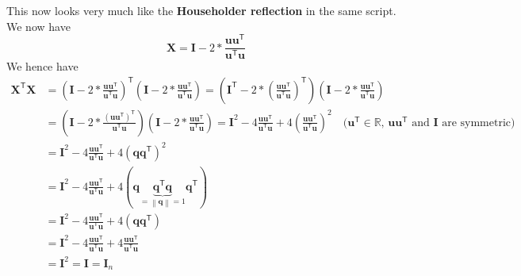 \documentclass{article}
\begin{document}
This now looks very much like the \textbf{Householder reflection} in the same script. We now have
\begin{equation*}
    \mathbf{X} = \mathbf{I} - 2 * \frac{\mathbf{u}\mathbf{u}^{\mathsf{T}}}{\mathbf{u}^{\mathsf{T}}\mathbf{u}}
\end{equation*}
We hence have
\begin{align*}
\mathbf{X}^{\mathsf{T}}\mathbf{X} &= \left(\mathbf{I} - 2 * \frac{\mathbf{u}\mathbf{u}^{\mathsf{T}}}{\mathbf{u}^{\mathsf{T}}\mathbf{u}}\right)^{\mathsf{T}}\left(\mathbf{I} - 2 * \frac{\mathbf{u}\mathbf{u}^{\mathsf{T}}}{\mathbf{u}^{\mathsf{T}}\mathbf{u}}\right) = \left(\mathbf{I}^{\mathsf{T}} - 2 *  \left(\frac{\mathbf{u}\mathbf{u}^{\mathsf{T}}}{\mathbf{u}^{\mathsf{T}}\mathbf{u}}\right)^{\mathsf{T}}\right)\left(\mathbf{I} - 2 * \frac{\mathbf{u}\mathbf{u}^{\mathsf{T}}}{\mathbf{u}^{\mathsf{T}}\mathbf{u}}\right) \\
&= \left(\mathbf{I} - 2 *  \frac{\left(\mathbf{u}\mathbf{u}^{\mathsf{T}}\right)^{\mathsf{T}}}{\mathbf{u}^{\mathsf{T}}\mathbf{u}}\right)\left(\mathbf{I} - 2 * \frac{\mathbf{u}\mathbf{u}^{\mathsf{T}}}{\mathbf{u}^{\mathsf{T}}\mathbf{u}}\right) 
 = \mathbf{I}^{2} - 4\frac{\mathbf{u}\mathbf{u}^{\mathsf{T}}}{\mathbf{u}^{\mathsf{T}}\mathbf{u}} + 4\left(\frac{\mathbf{u}\mathbf{u}^{\mathsf{T}}}{\mathbf{u}^{\mathsf{T}}\mathbf{u}}\right)^{2} \quad \text{($\mathbf{u}^{\mathsf{T}}\in \mathbb{R}$, $\mathbf{u}\mathbf{u}^{\mathsf{T}}$ and $\mathbf{I}$ are symmetric)} \\
&= \mathbf{I}^{2} - 4\frac{\mathbf{u}\mathbf{u}^{\mathsf{T}}}{\mathbf{u}^{\mathsf{T}}\mathbf{u}} + 4\left(\mathbf{q}\mathbf{q}^{\mathsf{T}}\right)^{2} \\
&= \mathbf{I}^{2} - 4\frac{\mathbf{u}\mathbf{u}^{\mathsf{T}}}{\mathbf{u}^{\mathsf{T}}\mathbf{u}} + 4\left(\mathbf{q}\underbrace{\mathbf{q}^{\mathsf{T}}\mathbf{q}}_{= \left\lVert\mathbf{q}\right\rVert = 1}\mathbf{q}^{\mathsf{T}}\right)
\\
&= \mathbf{I}^{2} - 4\frac{\mathbf{u}\mathbf{u}^{\mathsf{T}}}{\mathbf{u}^{\mathsf{T}}\mathbf{u}} + 4\left(\mathbf{q}\mathbf{q}^{\mathsf{T}}\right) \\
&=
\mathbf{I}^{2} - 4\frac{\mathbf{u}\mathbf{u}^{\mathsf{T}}}{\mathbf{u}^{\mathsf{T}}\mathbf{u}} + 4\frac{\mathbf{u}\mathbf{u}^{\mathsf{T}}}{\mathbf{u}^{\mathsf{T}}\mathbf{u}}\\
&= \mathbf{I}^{2} = \mathbf{I} = \mathbf{I}_{n}
\end{align*}

\pagebreak
\end{document}
